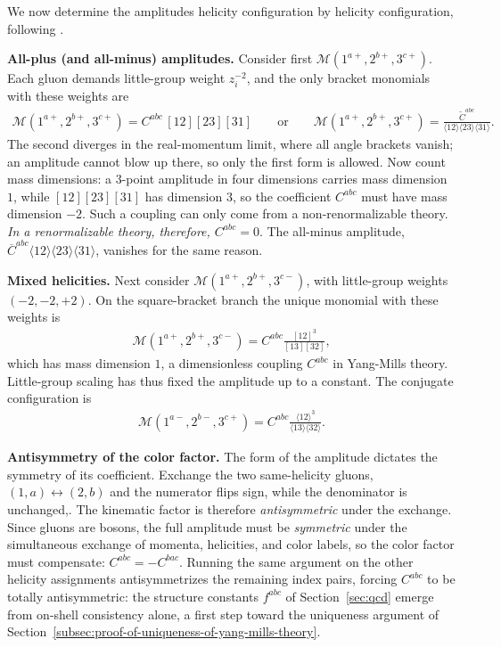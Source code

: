 We now determine the amplitudes helicity configuration by helicity configuration, following \autocite[(27.92) and below]{schwartzQFT2014}.

\textbf{All-plus (and all-minus) amplitudes.} Consider first $\mathcal{M}(1^{a+}, 2^{b+}, 3^{c+})$. Each gluon demands little-group weight $z_i^{-2}$, and the only bracket monomials with these weights are
\begin{align*}
	\mathcal{M}(1^{a+}, 2^{b+}, 3^{c+})
	= C^{abc}\,[12][23][31]
	\qquad \text{or} \qquad
	\mathcal{M}(1^{a+}, 2^{b+}, 3^{c+})
	= \frac{\widetilde{C}^{abc}}{\langle 12\rangle\langle 23\rangle\langle 31\rangle}.
\end{align*}
The second diverges in the real-momentum limit, where all angle brackets vanish; an amplitude cannot blow up there, so only the first form is allowed. Now count mass dimensions: a $3$-point amplitude in four dimensions carries mass dimension $1$, while $[12][23][31]$ has dimension $3$, so the coefficient $C^{abc}$ must have mass dimension $-2$. Such a coupling can only come from a non-renormalizable theory. \emph{In a renormalizable theory, therefore, $C^{abc} = 0$}. The all-minus amplitude, $\overline{C}^{abc} \langle 12\rangle\langle 23\rangle\langle 31\rangle$, vanishes for the same reason.

\textbf{Mixed helicities.} Next consider $\mathcal{M}(1^{a+}, 2^{b+}, 3^{c-})$, with little-group weights $(-2, -2, +2)$. On the square-bracket branch the unique monomial with these weights is
\begin{align*}
	\mathcal{M}\left(1^{a+},2^{b+},3^{c-}\right)
	= C^{abc}\frac{[12]^3}{[13][32]},
\end{align*}
which has mass dimension $1$, a dimensionless coupling $C^{abc}$ in Yang-Mills theory. Little-group scaling has thus fixed the amplitude up to a constant. The conjugate configuration is
\begin{align*}
	\mathcal{M}\left(1^{a-},2^{b-},3^{c+}\right)
	= C^{abc}\frac{\langle 12\rangle^3}{\langle 13\rangle\langle 32\rangle}.
\end{align*}

\textbf{Antisymmetry of the color factor.} The form of the amplitude dictates the symmetry of its coefficient. Exchange the two same-helicity gluons, $(1, a) \leftrightarrow (2, b)$ and the numerator flips sign, while the denominator is unchanged,. The kinematic factor is therefore \emph{antisymmetric} under the exchange. Since gluons are bosons, the full amplitude must be \emph{symmetric} under the simultaneous exchange of momenta, helicities, and color labels, so the color factor must compensate: $C^{abc} = -C^{bac}$. Running the same argument on the other helicity assignments antisymmetrizes the remaining index pairs, forcing $C^{abc}$ to be totally antisymmetric: the structure constants $f^{abc}$ of Section~\ref{sec:qcd} emerge from on-shell consistency alone, a first step toward the uniqueness argument of Section~\ref{subsec:proof-of-uniqueness-of-yang-mills-theory}.

